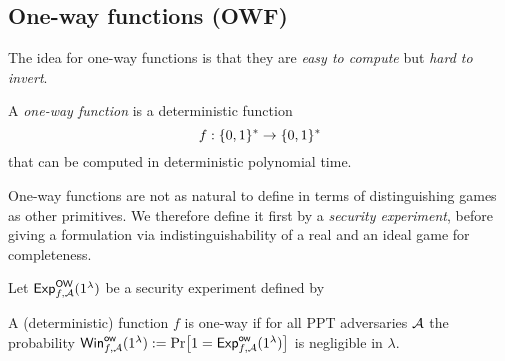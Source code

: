 \subsection{One-way functions (OWF)}
The idea for one-way functions is that they are \emph{easy to compute} but \emph{hard to invert}.

\begin{syntax}
A \emph{one-way function} is a deterministic function 
\[f:\{0,1\}^*\rightarrow\{0,1\}^*\] 
that can be computed in deterministic polynomial time.
\end{syntax}

One-way functions are not as natural to define in terms of distinguishing games as other primitives. We therefore define it first by a \emph{security experiment}, before giving a formulation via indistinguishability of a real and an ideal game for completeness.

\begin{security}\label{secdef:owf}
Let ${\mathsf{Exp}}_{f,\mathcal{A}}^{\mathsf{OW}}(1^\lambda)$ be a security experiment defined by
\begin{center}
\end{center}
A (deterministic) function $f$ is one-way if for all PPT adversaries $\mathcal{A}$ the probability $\mathsf{Win}^{\mathsf{ow}}_{f,\adv}(1^\lambda):=\prob{1={\mathsf{Exp}}_{f,\adv}^{\mathsf{ow}}(1^\lambda)}$ is negligible in $\lambda$.
\end{security}


